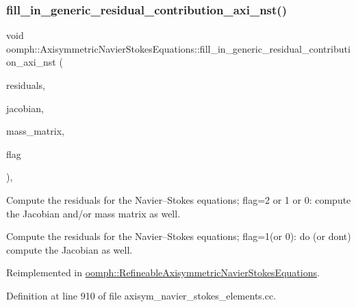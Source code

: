 \subsubsection{\texorpdfstring{fill\+\_\+in\+\_\+generic\+\_\+residual\+\_\+contribution\+\_\+axi\+\_\+nst()}{fill\_in\_generic\_residual\_contribution\_axi\_nst()}}
{\footnotesize\ttfamily void oomph\+::\+Axisymmetric\+Navier\+Stokes\+Equations\+::fill\+\_\+in\+\_\+generic\+\_\+residual\+\_\+contribution\+\_\+axi\+\_\+nst (\begin{DoxyParamCaption}\item[{\hyperlink{classoomph_1_1Vector}{Vector}$<$ double $>$ \&}]{residuals,  }\item[{\hyperlink{classoomph_1_1DenseMatrix}{Dense\+Matrix}$<$ double $>$ \&}]{jacobian,  }\item[{\hyperlink{classoomph_1_1DenseMatrix}{Dense\+Matrix}$<$ double $>$ \&}]{mass\+\_\+matrix,  }\item[{unsigned}]{flag }\end{DoxyParamCaption})\hspace{0.3cm}{\ttfamily [protected]}, {\ttfamily [virtual]}}



Compute the residuals for the Navier--Stokes equations; flag=2 or 1 or 0\+: compute the Jacobian and/or mass matrix as well. 

Compute the residuals for the Navier--Stokes equations; flag=1(or 0)\+: do (or don\textquotesingle{}t) compute the Jacobian as well. 

Reimplemented in \hyperlink{classoomph_1_1RefineableAxisymmetricNavierStokesEquations_a9ac92aefcee6fd7ef3e7c61af9bd305f}{oomph\+::\+Refineable\+Axisymmetric\+Navier\+Stokes\+Equations}.



Definition at line 910 of file axisym\+\_\+navier\+\_\+stokes\+\_\+elements.\+cc.



